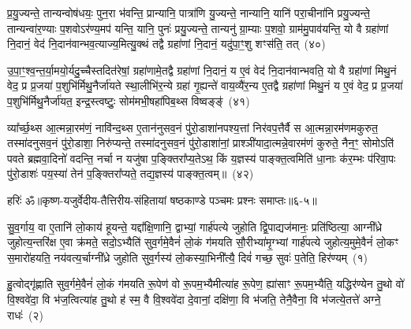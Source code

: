 प्र॒यु॒ज्यन्ते॒ तान्यन्वोष॑धयः॒ पुन॒रा भ॑वन्ति॒ प्रान्यानि॒ पात्रा॑णि यु॒ज्यन्ते॒ नान्यानि॒ यानि॑ परा॒चीना॑नि प्रयु॒ज्यन्ते॒ तान्यन्वा॑र॒ण्याः प॒शवो\-ऽर॑ण्य॒मप॑ यन्ति॒ यानि॒ पुनः॑ प्रयु॒ज्यन्ते॒ तान्यनु॑ ग्रा॒म्याः प॒शवो॒ ग्राम॑मु॒पाव॑यन्ति॒ यो वै ग्रहा॑णां नि॒दानं॒ वेद॑ नि॒दान॑वान्भव॒त्याज्य॒मित्यु॒क्थं तद्वै ग्रहा॑णां नि॒दानं॒ यदु॑पा॒ꣳ॒शु शꣳस॑ति॒ तत्~(४०)

उ॒पा॒ꣳ॒श्व॒न्त॒र्या॒मयो॒र्यदु॒च्चैस्तदित॑रेषां॒ ग्रहा॑णामे॒तद्वै ग्रहा॑णां नि॒दानं॒ य ए॒वं वेद॑ नि॒दान॑वान्भवति॒ यो वै ग्रहा॑णां मिथु॒नं वेद॒ प्र प्र॒जया॑ प॒शुभि॑र्मिथु॒नैर्जा॑यते स्था॒लीभि॑र॒न्ये ग्रहा॑ गृ॒ह्यन्ते॑ वाय॒व्यै॑र॒न्य ए॒तद्वै ग्रहा॑णां मिथु॒नं य ए॒वं वेद॒ प्र प्र॒जया॑ प॒शुभि॑र्मिथु॒नैर्जा॑यत॒ इन्द्र॒स्त्वष्टुः॒ सोम॑मभी॒षहा॑पिब॒थ्स विष्वङ्ङ्॑~(४१)

व्या᳚र्च्छ॒थ्स आ॒त्मन्ना॒रम॑णं॒ नावि॑न्द॒थ्स ए॒तान॑नुसव॒नं पु॑रो॒डाशा॑नपश्य॒त्तां निर॑वप॒त्तैर्वै स आ॒त्मन्ना॒रम॑णमकुरुत॒ तस्मा॑दनुसव॒नं पु॑रो॒डाशा॒ निरु॑प्यन्ते॒ तस्मा॑दनुसव॒नं पु॑रो॒डाशा॑नां॒ प्राश्ञी॑यादा॒त्मन्ने॒वारम॑णं कुरुते॒ नैन॒ꣳ॒ सोमो\-ऽति॑ पवते ब्रह्मवा॒दिनो॑ वदन्ति॒ नर्चा न यजु॑षा प॒ङ्क्तिरा᳚प्य॒ते\-ऽथ॒ किं य॒ज्ञस्य॑ पाङ्क्त॒त्वमिति॑ धा॒नाः क॑र॒म्भः प॑रिवा॒पः पु॑रो॒डाशः॑ पय॒स्या॑ तेन॑ प॒ङ्क्तिरा᳚प्यते॒ तद्य॒ज्ञस्य॑ पाङ्क्त॒त्वम्॥~(४२)

{\anuvakamend[{भ॒व॒न्ति॒ यानि॒ पुनः॒ शꣳस॑ति॒ तद्विष्व॒ङ्किञ्चतु॑र्दश च}]}%

{हरिः॑ ॐ}{॥कृष्ण-यजुर्वेदीय-तैत्तिरीय-संहितायां षष्ठकाण्डे पञ्चमः प्रश्नः समाप्तः॥६-५॥}

\setcounter{anuvakam}{0}
सु॒व॒र्गाय॒ वा ए॒तानि॑ लो॒काय॑ हूयन्ते॒ यद्दा᳚क्षि॒णानि॒ द्वाभ्यां॒ गार्\mbox{}ह॑पत्ये जुहोति द्वि॒पाद्यज॑मानः॒ प्रति॑ष्ठित्या॒ आग्नी᳚ध्रे जुहोत्य॒न्तरि॑क्ष ए॒वा क्र॑मते॒ सदो॒\-ऽभ्यैति॑ सुव॒र्गमे॒वैनं॑ लो॒कं ग॑मयति सौ॒रीभ्या॑मृ॒ग्भ्यां गार्\mbox{}ह॑पत्ये जुहोत्य॒मुमे॒वैनं॑ लो॒कꣳ स॒मारो॑हयति॒ नय॑वत्य॒र्चाग्नी᳚ध्रे जुहोति सुव॒र्गस्य॑ लो॒कस्या॒भिनी᳚त्यै॒ दिवं॑ गच्छ॒ सुवः॑ प॒तेति॒ हिर॑ण्यम्~(१)

हु॒त्वोद्गृ॑ह्णाति सुव॒र्गमे॒वैनं॑ लो॒कं ग॑मयति रू॒पेण॑ वो रू॒पम॒भ्यैमीत्या॑ह रू॒पेण॒ ह्या॑साꣳ रू॒पम॒भ्यैति॒ यद्धिर॑ण्येन तु॒थो वो॑ वि॒श्ववे॑दा॒ वि भ॑ज॒त्वित्या॑ह तु॒थो ह॑ स्म॒ वै वि॒श्ववे॑दा दे॒वानां॒ दक्षि॑णा॒ वि भ॑जति॒ तेनै॒वैना॒ वि भ॑जत्ये॒तत्ते॑ अग्ने॒ राधः॑~(२)

